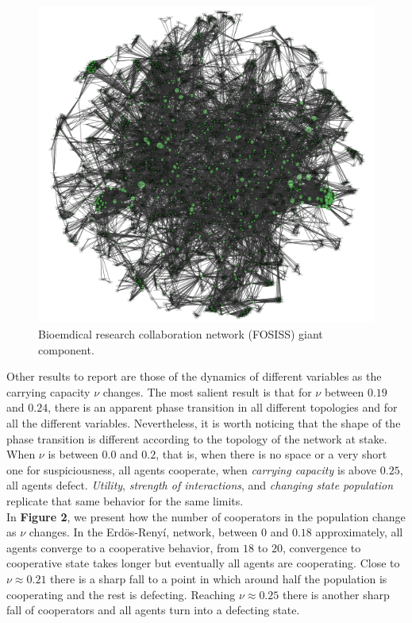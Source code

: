 \documentclass[11pt]{article}
\begin{document}
\begin{figure} [h!]
\centering
\includegraphics[scale=0.5]{images/Fosiss_GC_final.png}
\caption{Bioemdical research collaboration network (FOSISS) giant component.}\label{Fosiss_GC}
\end{figure}

\FloatBarrier

Other results to report are those of the dynamics of different
variables as the carrying capacity $\nu$ changes. The  most salient
result is that for $\nu$ between $0.19$ and $0.24$, there is an
apparent phase transition in all different topologies and for all the
different variables. Nevertheless, it is worth noticing that the shape
of the phase transition is different according to the topology of the
network at stake. When $\nu$ is between $0.0$ and $0.2$, that is, when there is
no space or a very short one for suspiciousness, all agents cooperate, when
\textit{carrying capacity} is above $0.25$, all agents defect. \textit{Utility},
\textit{strength of interactions}, and \textit{changing state population}
replicate that same behavior for the same limits. \\ 

In \textbf{Figure 2}, we present how the number of cooperators in the population
change as $\nu$ changes. In the Erd\"{o}s-Reny\'i, network, between $0$ and
$0.18$ approximately, all agents converge to a cooperative behavior, from $18$
to $20$, convergence to cooperative state takes longer but eventually all agents
are cooperating. Close to $\nu \approx 0.21$ there is a sharp fall to a point in
which around half the population is cooperating and the rest is
defecting. Reaching $\nu \approx 0.25$ there is another sharp fall of
cooperators and all agents turn into a defecting state.\\
\end{document}
